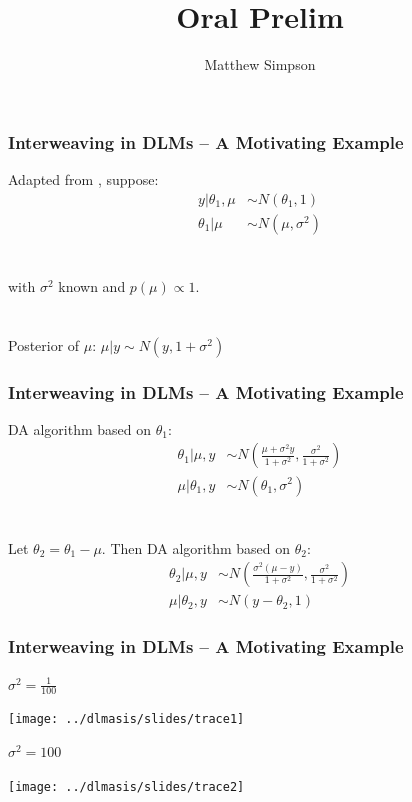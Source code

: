 \documentclass[xcolor=dvipsnames]{beamer}
\title[Oral Prelim]{Oral Prelim}
\author[Matt Simpson]{Matthew Simpson}
\date{}
\institute[]{Departments of Statistics and Economics, Iowa State University}
\begin{document}
\begin{frame}
\titlepage
\end{frame}

\begin{frame}
\frametitle{Interweaving in DLMs -- A Motivating Example}
Adapted from \citet{yu2011center}, suppose:\\
\begin{align*}
y|\theta_1, \mu & \sim N(\theta_1, 1) \\
\theta_1|\mu & \sim N(\mu, \sigma^2) 
\end{align*}\\~\\
with $\sigma^2$ known and $p(\mu)\propto 1$.\\~\\~\\

\pause Posterior of $\mu$: $\mu|y \sim N(y,1+\sigma^2)$

\end{frame}

\begin{frame}
\frametitle{Interweaving in DLMs -- A Motivating Example}

DA algorithm based on $\theta_1$:
\begin{align*}
\theta_1|\mu,y &\sim N\left(\frac{\mu + \sigma^2y}{1+\sigma^2}, \frac{\sigma^2}{1+\sigma^2}\right)\\
\mu |\theta_1, y &\sim N(\theta_1, \sigma^2)
\end{align*}\\~\\

\pause Let $\theta_2 = \theta_1 - \mu$. Then DA algorithm based on $\theta_2$:
\begin{align*}
\theta_2|\mu,y &\sim N\left(\frac{\sigma^2(\mu - y)}{1+\sigma^2}, \frac{\sigma^2}{1+\sigma^2}\right)\\
\mu |\theta_2, y &\sim N(y-\theta_2, 1)
\end{align*}
\end{frame}

\begin{frame}
\frametitle{Interweaving in DLMs -- A Motivating Example}
$\sigma^2=\frac{1}{100}$
\begin{center}
\texttt{[image: ../dlmasis/slides/trace1]}\\
\end{center}
$\sigma^2=100$
\begin{center}
\texttt{[image: ../dlmasis/slides/trace2]}
\end{center}
\end{frame}
\end{document}
